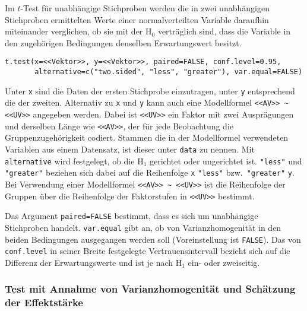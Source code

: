 Im $t$-Test für unabhängige Stichproben werden die in zwei unabhängigen Stichproben ermittelten Werte einer normalverteilten Variable daraufhin miteinander verglichen, ob sie mit der $\text{H}_{0}$ verträglich sind, dass die Variable in den zugehörigen Bedingungen denselben Erwartungswert besitzt.
\begin{lstlisting}
t.test(x=<<Vektor>>, y=<<Vektor>>, paired=FALSE, conf.level=0.95,
       alternative=c("two.sided", "less", "greater"), var.equal=FALSE)
\end{lstlisting}

Unter \lstinline!x! sind die Daten der ersten Stichprobe einzutragen, unter \lstinline!y! entsprechend die der zweiten. Alternativ zu \lstinline!x! und \lstinline!y! kann auch eine Modellformel \lstinline!<<AV>> ~ <<UV>>! angegeben werden. Dabei ist \lstinline!<<UV>>! ein Faktor mit zwei Ausprägungen und derselben Länge wie \lstinline!<<AV>>!, der für jede Beobachtung die Gruppenzugehörigkeit codiert. Stammen die in der Modellformel verwendeten Variablen aus einem Datensatz, ist dieser unter \lstinline!data! zu nennen. Mit \lstinline!alternative! wird festgelegt, ob die $\text{H}_{1}$ gerichtet oder ungerichtet ist. \lstinline!"less"! und \lstinline!"greater"! beziehen sich dabei auf die Reihenfolge \lstinline!x! \lstinline!"less"! bzw.\ \lstinline!"greater"! \lstinline!y!. Bei Verwendung einer Modellformel \lstinline!<<AV>> ~ <<UV>>! ist die Reihenfolge der Gruppen über die Reihenfolge der Faktorstufen in \lstinline!<<UV>>! bestimmt.

Das Argument \lstinline!paired=FALSE! bestimmt, dass es sich um unabhängige Stichproben handelt. \lstinline!var.equal! gibt an, ob von Varianzhomogenität in den beiden Bedingungen ausgegangen werden soll (Voreinstellung ist \lstinline!FALSE!). Das von \lstinline!conf.level! in seiner Breite festgelegte Vertrauensintervall bezieht sich auf die Differenz der Erwartungswerte und ist je nach $\text{H}_{1}$ ein- oder zweiseitig.

\subsubsection{Test mit Annahme von Varianzhomogenität und Schätzung der Effektstärke}


